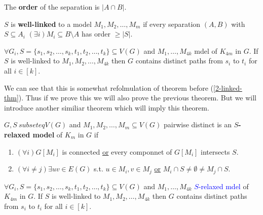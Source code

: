 \begin{defn}
	The \textbf{order} of the separation is $|A \cap B|$.
\end{defn}

\begin{defn}
	$S$ is \textbf{well-linked} to a model $M_{1}, M_{2}, \dots, M_{m}$ if every separation $(A,B)$ with $S \subseteq A_{i}$ $(\exists i) M_{i} \subseteq B \setminus A$ has order $\geq |S|$.
\end{defn}

\begin{thm}
	$\forall G_{i}, S = \{s_{1}, s_{2}, \dots, s_{k}, t_{1}, t_{2}, \dots, t_{k}\} \subseteq V(G)$ and $M_{1}, \dots, M_{4k}$ mdel of $K_{4m}$ in $G$. If $S$  is well-linked to $M_{1}, M_{2}, \dots, M_{4k}$ then $G$ contains distinct paths from $s_{i}$ to $t_{i}$ for all $i \in [k]$.
\end{thm}

We can see that this is somewhat refolmulation of theorem before (\ref{2-linked-thm}). Thus if we prove this we will also prove the previous theorem. But we will introduce another similiar theorem which will imply this theorem.

\begin{defn}
	$G, S\ subseteq V(G)$ and $M_{1}, M_{2}, \dots, M_{m} \subseteq V(G)$ pairwise distinct is an \textbf{$S$-relaxed model} of $K_{m}$ in $G$ if
	
	\begin{enumerate}
		\item $(\forall i) G[M_{i}]$ is connected \underline{or} every componnet of $G[M_{i}]$ intersects $S$.
		\item $(\forall i \neq j) \exists uv \in E(G)$ s.t. $u \in M_{i}, v \in M_{j}$ \underline{or} $M_{i} \cap S \neq \emptyset \neq M_{j} \cap S$.
	\end{enumerate}
\end{defn}

\begin{thm}[\textcolor{blue}{Slightly changed}]
	$\forall G_{i}, S = \{s_{1}, s_{2}, \dots, s_{k}, t_{1}, t_{2}, \dots, t_{k}\} \subseteq V(G)$ and $M_{1}, \dots, M_{4k}$ \textcolor{blue}{$S$-relaxed mdel} of $K_{4m}$ in $G$. If $S$  is well-linked to $M_{1}, M_{2}, \dots, M_{4k}$ then $G$ contains distinct paths from $s_{i}$ to $t_{i}$ for all $i \in [k]$.
\end{thm}

